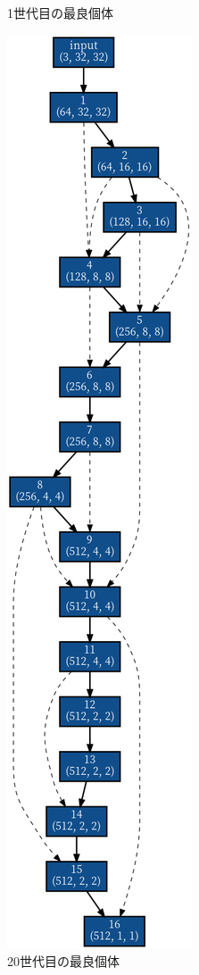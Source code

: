 \documentclass[twocolumn]{jarticle}     %
\begin{document}
\begin{figure}[tb]
\begin{minipage}{0.5\hsize}
\begin{center}
 		\caption{1世代目の最良個体}
 		\label{fig:graph1}
 	\end{center}
 \end{minipage}
 \begin{minipage}{0.5\hsize}
 	\begin{center}
 		\includegraphics[clip,scale=0.25]{graph_g20.png}
 		\caption{20世代目の最良個体}
 		\label{fig:graph20}
 	\end{center}
 \end{minipage}
\end{figure}
\end{document}
